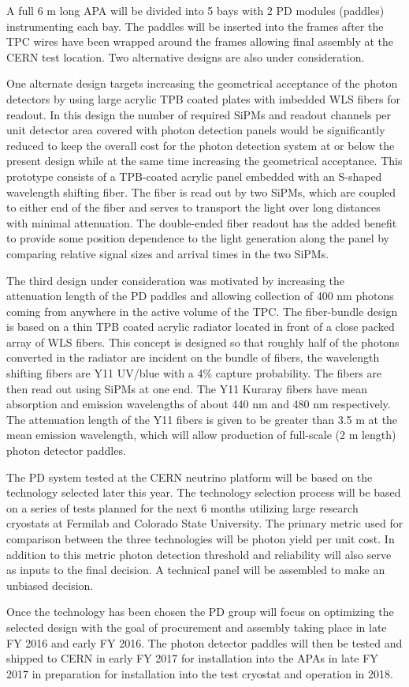 A full 6 m long APA will be divided into 5 bays with 2 PD modules (paddles) instrumenting each bay. The paddles will be inserted into the frames after the TPC wires have been wrapped around the frames allowing  final assembly at the CERN test location. Two alternative designs are also under consideration. 


One alternate design targets increasing the geometrical acceptance of the photon detectors by using large acrylic TPB coated plates with imbedded WLS fibers for readout. In this design the number of required SiPMs and readout channels per unit detector area covered with photon detection panels would be significantly reduced to keep the overall cost for the photon detection system at or below the present design while at the same time increasing the geometrical acceptance. This prototype consists of a TPB-coated acrylic panel embedded with an S-shaped wavelength shifting fiber. The fiber is read out by two SiPMs, which are coupled to either end of the fiber and serves to transport the light over long distances with minimal attenuation. The double-ended fiber readout has the added benefit to provide some position dependence to the light generation along the panel by comparing relative signal sizes and arrival times in the two SiPMs. 



The third design under consideration was motivated by increasing the attenuation length of the PD paddles and allowing collection of 400 nm photons coming from anywhere in the active volume of the TPC.  The fiber-bundle design is based on a thin TPB coated acrylic radiator located in front of a close packed array of WLS fibers. This concept is designed so that roughly half of the photons converted in the radiator are incident on the bundle of fibers, the wavelength shifting fibers are Y11 UV/blue with a 4\% capture probability. The fibers are then read out using SiPMs at one end. The Y11  Kuraray fibers have mean absorption and emission wavelengths of about 440 nm and 480 nm respectively.  The attenuation length of the Y11 fibers is given to be greater than 3.5 m at the mean emission wavelength, which will allow production of full-scale (2 m length) photon detector paddles.

The PD system tested at the CERN neutrino platform will be based on the technology selected later this year. The technology selection process will be based on a series of tests planned for the next 6 months utilizing large research cryostats at Fermilab and Colorado State University. The primary metric used for comparison between the three technologies will be photon yield per unit cost. In addition to this metric photon detection threshold and reliability will also serve as inputs to the final decision. A technical panel will be assembled to make an unbiased decision. 

Once the technology has been chosen the PD group will focus on optimizing the selected design with the goal of procurement and assembly taking place in late FY 2016 and early FY 2016. The photon detector paddles will then be tested and shipped to CERN in early FY 2017 for installation into the APAs in late FY 2017 in preparation for installation into the test cryostat and operation in 2018. 
